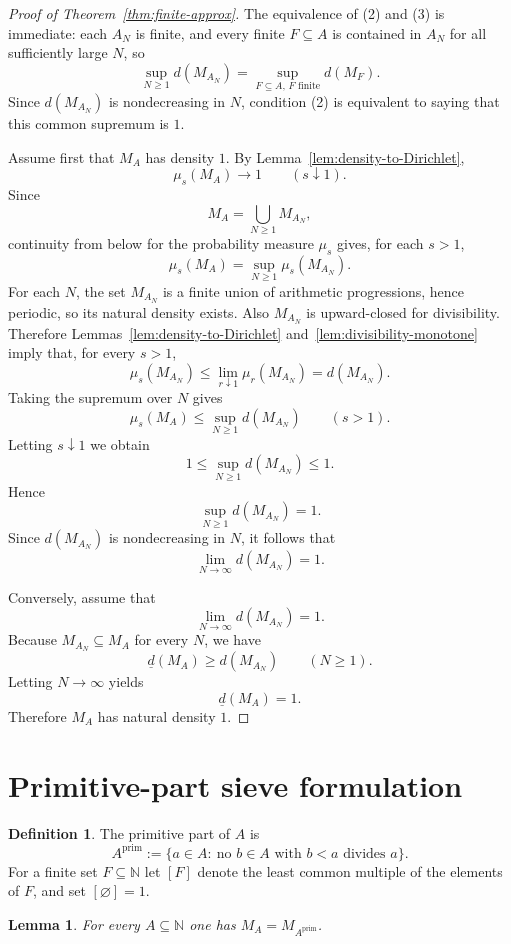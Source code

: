 \documentclass[11pt]{article}
\newtheorem{lemma}[theorem]{Lemma}
\theoremstyle{definition}
\newtheorem{definition}[theorem]{Definition}
\theoremstyle{remark}
\newcommand{\N}{\mathbb N}
\newcommand{\PP}{A^{\mathrm{prim}}}
\begin{document}
\begin{proof}[Proof of Theorem~\ref{thm:finite-approx}]
The equivalence of \textup{(2)} and \textup{(3)} is immediate: each \(A_N\) is finite, and every finite \(F\subseteq A\) is contained in \(A_N\) for all sufficiently large \(N\), so
\[
\sup_{N\ge 1} d(M_{A_N})=\sup_{F\subseteq A,\,F\text{ finite}} d(M_F).
\]
Since \(d(M_{A_N})\) is nondecreasing in \(N\), condition \textup{(2)} is equivalent to saying that this common supremum is \(1\).

Assume first that \(M_A\) has density \(1\).
By Lemma~\ref{lem:density-to-Dirichlet},
\[
\mu_s(M_A)\to 1
\qquad (s\downarrow 1).
\]
Since
\[
M_A=\bigcup_{N\ge 1} M_{A_N},
\]
continuity from below for the probability measure \(\mu_s\) gives, for each \(s>1\),
\[
\mu_s(M_A)=\sup_{N\ge 1}\mu_s(M_{A_N}).
\]
For each \(N\), the set \(M_{A_N}\) is a finite union of arithmetic progressions, hence periodic, so its natural density exists.
Also \(M_{A_N}\) is upward-closed for divisibility.
Therefore Lemmas~\ref{lem:density-to-Dirichlet} and~\ref{lem:divisibility-monotone} imply that, for every \(s>1\),
\[
\mu_s(M_{A_N})
\le
\lim_{r\downarrow 1}\mu_r(M_{A_N})
=
 d(M_{A_N}).
\]
Taking the supremum over \(N\) gives
\[
\mu_s(M_A)\le \sup_{N\ge 1} d(M_{A_N})
\qquad (s>1).
\]
Letting \(s\downarrow 1\) we obtain
\[
1\le \sup_{N\ge 1} d(M_{A_N})\le 1.
\]
Hence
\[
\sup_{N\ge 1} d(M_{A_N})=1.
\]
Since \(d(M_{A_N})\) is nondecreasing in \(N\), it follows that
\[
\lim_{N\to\infty} d(M_{A_N})=1.
\]

Conversely, assume that
\[
\lim_{N\to\infty} d(M_{A_N})=1.
\]
Because \(M_{A_N}\subseteq M_A\) for every \(N\), we have
\[
\underline d(M_A)\ge d(M_{A_N})
\qquad (N\ge 1).
\]
Letting \(N\to\infty\) yields
\[
\underline d(M_A)=1.
\]
Therefore \(M_A\) has natural density \(1\).
\end{proof}

\section{Primitive-part sieve formulation}

\begin{definition}
The primitive part of \(A\) is
\[
\PP:=\{a\in A:\ \text{no }b\in A\text{ with }b<a\text{ divides }a\}.
\]
For a finite set \(F\subseteq\N\) let \([F]\) denote the least common multiple of the elements of \(F\), and set \([\varnothing]=1\).
\end{definition}

\begin{lemma}\label{lem:primitive-same}
For every \(A\subseteq\N\) one has \(M_A=M_{\PP}\).
\end{lemma}
\end{document}
